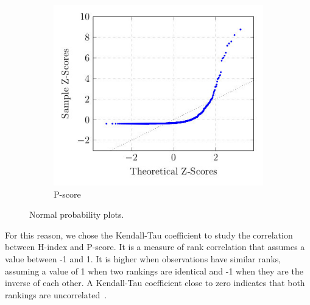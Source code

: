 \documentclass[man,floatsintext]{apa6}
\let \cite \parencite
\begin{document}
\begin{figure}[h]
\begin{subfigure}[b]{0.4\textwidth}
\end{subfigure}  
\begin{subfigure}[b]{0.4\textwidth}
    \centerline{\includegraphics[scale=0.45]{normal_plot_pscore}}

    \caption{P-score}
    \label{fig:pscore_normality}

\end{subfigure}  
\caption{Normal probability plots.}
\end{figure}

For this reason, we chose the Kendall-Tau coefficient to
study the correlation 
between H-index and P-score. It is a measure of rank
correlation that assumes a value between
-1 and 1. It is higher when observations have similar
ranks, assuming a value of 1
when two rankings are identical and -1 when they are the inverse of each other. 
A Kendall-Tau coefficient close to zero indicates
that both rankings are uncorrelated~\cite{Kendall1955, Baeza-Yates2011}.
\end{document}
